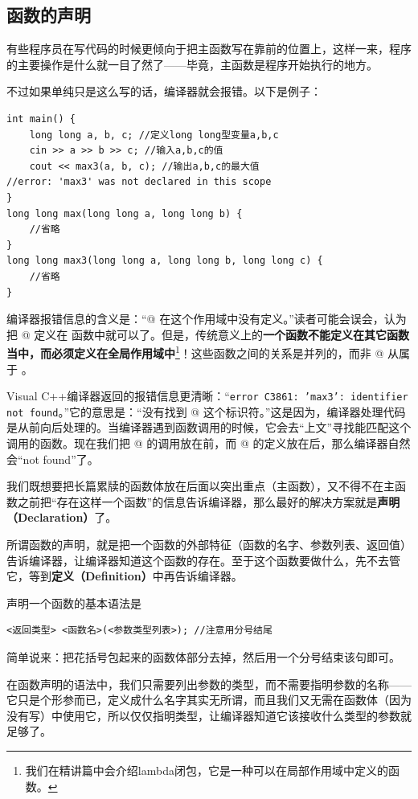 \subsection*{函数的声明}
有些程序员在写代码的时候更倾向于把主函数写在靠前的位置上，这样一来，程序的主要操作是什么就一目了然了——毕竟，主函数是程序开始执行的地方。\par
不过如果单纯只是这么写的话，编译器就会报错。以下是例子：
\begin{lstlisting}
int main() {
    long long a, b, c; //定义long long型变量a,b,c
    cin >> a >> b >> c; //输入a,b,c的值
    cout << max3(a, b, c); //输出a,b,c的最大值
//error: 'max3' was not declared in this scope
}
long long max(long long a, long long b) {
    //省略
}
long long max3(long long a, long long b, long long c) {
    //省略
}
\end{lstlisting}
编译器报错信息的含义是：``@ 在这个作用域中没有定义。''读者可能会误会，认为把 @ 定义在 \lstinline@main@ 函数中就可以了。但是，传统意义上的\textbf{一个函数不能定义在其它函数当中，而必须定义在全局作用域中}\footnote{我们在精讲篇中会介绍lambda闭包，它是一种可以在局部作用域中定义的函数。}！这些函数之间的关系是并列的，而非 @ 从属于 \lstinline@main@。\par
Visual C++编译器返回的报错信息更清晰：``\texttt{error C3861: 'max3': identifier not found}。''它的意思是：``没有找到 @ 这个标识符。''这是因为，编译器处理代码是从前向后处理的。当编译器遇到函数调用的时候，它会去``上文''寻找能匹配这个调用的函数。现在我们把 @ 的调用放在前，而 @ 的定义放在后，那么编译器自然会``not found''了。\par
我们既想要把长篇累牍的函数体放在后面以突出重点（主函数），又不得不在主函数之前把``存在这样一个函数''的信息告诉编译器，那么最好的解决方案就是\textbf{声明（Declaration）}了。\par
所谓函数的声明，就是把一个函数的外部特征（函数的名字、参数列表、返回值）告诉编译器，让编译器知道这个函数的存在。至于这个函数要做什么，先不去管它，等到\textbf{定义（Definition）}中再告诉编译器。\par
声明一个函数的基本语法是
\begin{lstlisting}
<返回类型> <函数名>(<参数类型列表>); //注意用分号结尾
\end{lstlisting}
简单说来：把花括号包起来的函数体部分去掉，然后用一个分号结束该句即可。\par
在函数声明的语法中，我们只需要列出参数的类型，而不需要指明参数的名称——它只是个形参而已，定义成什么名字其实无所谓，而且我们又无需在函数体（因为没有写）中使用它，所以仅仅指明类型，让编译器知道它该接收什么类型的参数就足够了。\par
